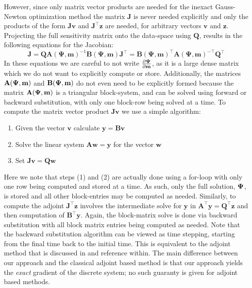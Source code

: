 \documentclass[11pt]{article}
\newcommand{\deriv}[2]{\frac{\partial #1}{\partial #2}}
\newcommand{\bfA}{\mathbf{A}}
\newcommand{\bfB}{\mathbf{B}}
\newcommand{\bfJ}{\mathbf{J}}
\newcommand{\bfQ}{\mathbf{Q}}
\newcommand{\bfm}{\mathbf{m}}
\newcommand{\bfv}{\mathbf{v}}
\newcommand{\bfw}{\mathbf{w}}
\newcommand{\bfy}{\mathbf{y}}
\newcommand{\bfz}{\mathbf{z}}
\newcommand{\bfPsi}{\boldsymbol{\Psi}}
\begin{document}
However, since only matrix vector products are needed for the inexact Gauss-Newton optimization
method the  matrix $\bfJ$ is never
needed explicitly  and only the products of the form $\bfJ \bfv$ and
$\bfJ^\top \bfz$ are needed, for arbitrary vectors $\bfv$ and $\bfz$.
Projecting the full sensitivity
matrix onto the data-space using $\bfQ$, results in the following
equations for the Jacobian:
\begin{subequations}
    \begin{equation}
    \label{eq:jacobian_Multiplication}
        \bfJ = \bfQ \bfA(\bfPsi,\bfm)^{-1} \bfB(\bfPsi,\bfm)
    \end{equation}
    \begin{equation}
    \label{eq:jacobianT_Multiplication}
        \bfJ^\top =   \bfB(\bfPsi,\bfm)^\top \bfA(\bfPsi,\bfm)^{-\top} \bfQ^\top
    \end{equation}
\end{subequations}
\noindent
In these equations we are careful to not write $\deriv{\bf\Psi}{\bfm}$, as it is
a large dense matrix which we do not want to explicitly compute or store.
Additionally, the matrices $\bf A(\bfPsi,\bfm)$ and $\bf B(\bfPsi,\bfm)$ do not even
need to be explicitly formed because the matrix $\bf A(\bfPsi,\bfm)$ is a
triangular block-system, and can be solved using forward or backward
substitution, with only one block-row being solved at a time.
To compute the matrix vector product $\bfJ \bfv$ we use a simple
algorithm:
\begin{enumerate}
    \item Given the vector $\bfv$ calculate $\bfy = \mathbf{Bv}$
    \item Solve the linear system $\mathbf{Aw} = \bfy$ for the vector $\bfw$
    \item Set $\bfJ \bfv = \bfQ \bfw$
\end{enumerate}
Here we note that steps (1) and (2) are actually done using a for-loop with
only one row being computed and stored at a time. As such, only the full
solution, $\bf \Psi$, is stored and all other block-entries may be
computed as needed. Similarly, to compute the adjoint
$\bfJ^\top \bfz$ involves the intermediate solve for $\bfy$
in $\bfA^\top \bfy = \bfQ^\top \bfz$ and then
computation of $\bfB^\top \bfy$. Again, the block-matrix solve is
done via backward substitution with all block matrix entries being computed as
needed.
Note that the backward substitution algorithm can be viewed as time stepping, starting
from the final time back to the initial time. This is equivalent to the adjoint method that
is discussed in \cite{DeanChen2011} and reference within. The main difference between
our approach and the classical adjoint based method is that our approach yields the {\em exact}
gradient of the discrete system; no such guaranty is given for adjoint based methods.
\end{document}

